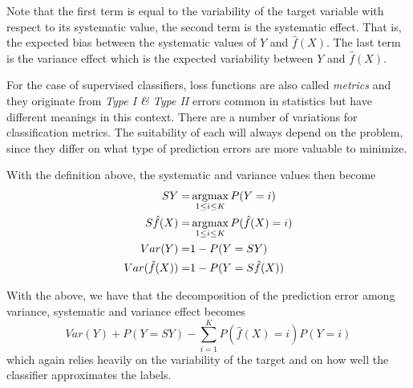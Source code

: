 \begin{appendices}
Note that the first term is equal to the variability of the target variable with respect to its systematic value, the second term is the systematic effect.
That is, the expected bias between the systematic values of $Y$ and $\hat{f}(X)$.
The last term is the variance effect which is the expected variability between $Y$ and $\hat{f}(X)$.


For the case of supervised classifiers, loss functions are also called \textit{metrics} and they originate from \textit{Type I \& Type II} errors common in statistics but have different meanings in this context.
There are a number of variations for classification metrics.
The suitability of each will always depend on the problem, since they differ on what type of prediction errors are more valuable to minimize.

With the definition above, the systematic and variance values then become
\begin{equation}
	\begin{split}
	SY = & \operatorname*{argmax}_{1\leq i \leq K} P(Y=i) \\
	S\hat{f}(X) = &\operatorname*{argmax}_{1\leq i \leq K} P(\hat{f}(X)=i) \\
	Var(Y) = &1 - P(Y=SY) \\
	Var(\hat{f}(X)) =& 1 - P(Y = S\hat{f}(X)) \\
	\end{split}
\end{equation}


With the above, we have that the decomposition of the prediction error among variance, systematic and variance effect becomes
\begin{equation}
Var(Y) + P(Y=SY) - \sum_{i=1}^K P(\hat{f}(X) =i)P(Y=i)
\end{equation}
	 which again relies heavily on the variability of the target and on how well the classifier approximates the labels.


\end{appendices}
